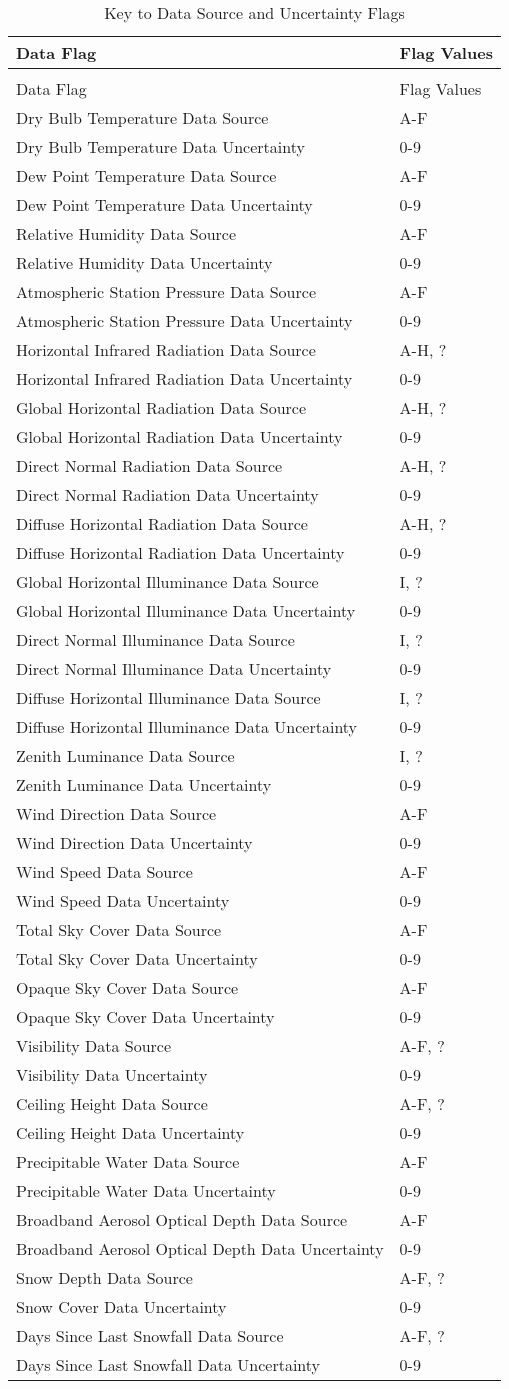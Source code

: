 \begin{longtable}[c]{@{}ll@{}}
\caption{Key to Data Source and Uncertainty Flags \label{table:key-to-data-source-and-uncertainty-flags}} \tabularnewline
\toprule 
Data Flag & Flag Values \tabularnewline
\midrule
\endfirsthead

\caption[]{Key to Data Source and Uncertainty Flags} \tabularnewline
\toprule 
Data Flag & Flag Values \tabularnewline
\midrule
\endhead

Dry Bulb Temperature Data Source & A-F \tabularnewline
Dry Bulb Temperature Data Uncertainty & 0-9 \tabularnewline
Dew Point Temperature Data Source & A-F \tabularnewline
Dew Point Temperature Data Uncertainty & 0-9 \tabularnewline
Relative Humidity Data Source & A-F \tabularnewline
Relative Humidity Data Uncertainty & 0-9 \tabularnewline
Atmospheric Station Pressure Data Source & A-F \tabularnewline
Atmospheric Station Pressure Data Uncertainty & 0-9 \tabularnewline
Horizontal Infrared Radiation Data Source & A-H, ? \tabularnewline
Horizontal Infrared Radiation Data Uncertainty & 0-9 \tabularnewline
Global Horizontal Radiation Data Source & A-H, ? \tabularnewline
Global Horizontal Radiation Data Uncertainty & 0-9 \tabularnewline
Direct Normal Radiation Data Source & A-H, ? \tabularnewline
Direct Normal Radiation Data Uncertainty & 0-9 \tabularnewline
Diffuse Horizontal Radiation Data Source & A-H, ? \tabularnewline
Diffuse Horizontal Radiation Data Uncertainty & 0-9 \tabularnewline
Global Horizontal Illuminance Data Source & I, ? \tabularnewline
Global Horizontal Illuminance Data Uncertainty & 0-9 \tabularnewline
Direct Normal Illuminance Data Source & I, ? \tabularnewline
Direct Normal Illuminance Data Uncertainty & 0-9 \tabularnewline
Diffuse Horizontal Illuminance Data Source & I, ? \tabularnewline
Diffuse Horizontal Illuminance Data Uncertainty & 0-9 \tabularnewline
Zenith Luminance Data Source & I, ? \tabularnewline
Zenith Luminance Data Uncertainty & 0-9 \tabularnewline
Wind Direction Data Source & A-F \tabularnewline
Wind Direction Data Uncertainty & 0-9 \tabularnewline
Wind Speed Data Source & A-F \tabularnewline
Wind Speed Data Uncertainty & 0-9 \tabularnewline
Total Sky Cover Data Source & A-F \tabularnewline
Total Sky Cover Data Uncertainty & 0-9 \tabularnewline
Opaque Sky Cover Data Source & A-F \tabularnewline
Opaque Sky Cover Data Uncertainty & 0-9 \tabularnewline
Visibility Data Source & A-F, ? \tabularnewline
Visibility Data Uncertainty & 0-9 \tabularnewline
Ceiling Height Data Source & A-F, ? \tabularnewline
Ceiling Height Data Uncertainty & 0-9 \tabularnewline
Precipitable Water Data Source & A-F \tabularnewline
Precipitable Water Data Uncertainty & 0-9 \tabularnewline
Broadband Aerosol Optical Depth Data Source & A-F \tabularnewline
Broadband Aerosol Optical Depth Data Uncertainty & 0-9 \tabularnewline
Snow Depth Data Source & A-F, ? \tabularnewline
Snow Cover Data Uncertainty & 0-9 \tabularnewline
Days Since Last Snowfall Data Source & A-F, ? \tabularnewline
Days Since Last Snowfall Data Uncertainty & 0-9 \tabularnewline
\bottomrule
\end{longtable}

